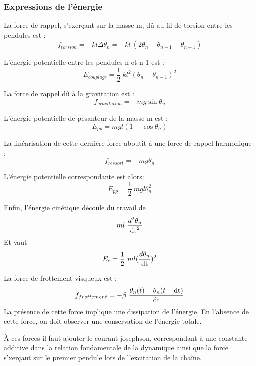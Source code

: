 \subsubsection{Expressions de l'énergie}

La force de rappel, s'exerçant sur la masse m, dû au fil de torsion entre les pendules est :
\[
f_{torsion} = -  k l \Delta \theta _n = -  k l\ (2\theta _n-\theta _{n-1}-\theta _{n+1})
\]

L'énergie potentielle entre les pendules n et n-1 est :
\[
E_{couplage} = \frac{1}{2}\ k l^2 (\theta _n-\theta _{n-1})^2
\]

La force de rappel dû à la gravitation est :
\[
f_{gravitation} = - m g \sin{\theta _n}
\]

L'énergie potentielle de pesanteur de la masse m est :
\[
E_{pp} = m g l (1 - \cos{\theta _n})
\]

La linéarisation de cette dernière force aboutit à une force de rappel harmonique :
\[
f_{ressort} = - m g \theta _n
\]

L'énergie potentielle correspondante est alors:
\[
E_{pp} = \frac{1}{2}\ m g l \theta _n^2
\]

Enfin, l'énergie cinétique découle du travail de 
\[
m l\ \frac{d^2 \theta _n}{\operatorname{dt}^2}
\]
%
Et vaut
\[
E_{c} = \frac{1}{2}\ m l (\frac{d \theta _n}{\operatorname{dt}})^2
\]


La force de frottement visqueux est :
%
\[
f_{frottement} = -  \beta\ \frac{\theta _n(t) - \theta _n(t-\operatorname{dt})}{\operatorname{dt}}
\]
%
La présence de cette force implique une dissipation de l'énergie. En l'absence de cette force, on doit observer une conservation de l'énergie totale.

À ces forces il faut ajouter le courant josephson, correspondant à une constante additive dans la relation fondamentale de la dynamique ainsi que la force s'xerçant sur le premier pendule lors de l'excitation de la chaîne.
